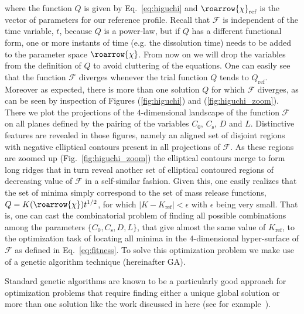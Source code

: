 \documentclass[superbib,unsortedaddress,preprint,byrevtex,aps,noshowpacs,titlepage]{revtex4}
\def\mytodo#1{$\clubsuit$\todo[noline]{$\clubsuit$\,\,\footnotesize #1}}
\def\vchi{\roarrow{\chi}}
\def\vchiref{\roarrow{\chi}_\text{ref}}
\def\Qref{Q_\text{ref}}
\def\calF{\mathcal{F}}
\def\Co{C_0}
\def\Cs{C_\text{s}}
\begin{document}
where the function $Q$ is given by Eq.~\ref{eq:higuchi} and $\vchiref$ is the vector of parameters for 
our reference profile.
Recall that $\calF$ is independent of the time variable, $t$, because $Q$ is a power-law, but if $Q$ has
a different functional form, one or more instants of time (e.g. the dissolution time) needs to be added
to the parameter space $\vchi$.
From now on we will drop the variables from the definition of $Q$ to avoid cluttering of the equations.
One can easily see that the function $\calF$ diverges whenever the trial function $Q$ tends to $\Qref$. 
Moreover as expected, there is more than one solution $Q$ for which $\calF$ diverges, as can be seen 
by inspection of Figures (\ref{fig:higuchi}) and (\ref{fig:higuchi_zoom}).
There we plot the projections of the $4$-dimensional landscape of the function $\calF$ on all planes defined by 
the pairing of the variables $\Co$, $\Cs$, $D$ and $L$.
Distinctive features are revealed in those figures, namely an aligned set of disjoint regions 
with negative elliptical contours present in all projections of $\calF$.
As these regions are zoomed up (Fig.~\ref{fig:higuchi_zoom}) the elliptical contours merge to form
long ridges that in turn reveal another set of elliptical contoured regions of decreasing value
of $\calF$ in a self-similar fashion.
Given this, one easily realizes that the set of minima simply correspond to the set of mass release 
functions, $Q= K(\vchi) t^{1/2}$, for which $|K-K_\text{ref}|<\epsilon$ with $\epsilon$ being very small. 
That is, one can cast the combinatorial problem of finding all possible combinations among the parameters 
$\{\Co, \Cs, D, L\}$, that give almost the same value of $K_\text{ref}$, to the optimization task of locating 
all minima in the $4$-dimensional hyper-surface of $\calF$ as defined in Eq.~\ref{eq:fitness}.
To solve this optimization problem we make use of a genetic algorithm technique (hereinafter GA).

Standard genetic algorithms are known to be a particularly good approach for optimization problems that require
finding either a unique global solution
or more than one solution like the work discussed in here (see for example~\cite{Goldberg1989,Kao2008}).
\end{document}

